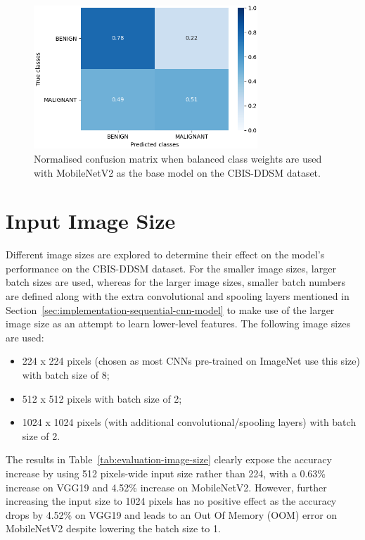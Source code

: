 \begin{figure}[h]
\centerline{\includegraphics[width=0.75\textwidth]{figures/evaluation/class_weights_experiment/balanced.png}}
\caption{\label{fig:evaluation-class_weights_experiment-balanced}Normalised confusion matrix when balanced class weights are used with MobileNetV2 as the base model on the CBIS-DDSM dataset.}
\end{figure}


\section{Input Image Size}
\label{sec:evaluation-input-image-size}

Different image sizes are explored to determine their effect on the model's performance on the CBIS-DDSM dataset. For the smaller image sizes, larger batch sizes are used, whereas for the larger image sizes, smaller batch numbers are defined along with the extra convolutional and spooling layers mentioned in Section~\ref{sec:implementation-sequential-cnn-model} to make use of the larger image size as an attempt to learn lower-level features. The following image sizes are used:
\begin{itemize}
    \item 224 x 224 pixels (chosen as most CNNs pre-trained on ImageNet use this size) with batch size of 8;
    \item 512 x 512 pixels with batch size of 2;
    \item 1024 x 1024 pixels (with additional convolutional/spooling layers) with batch size of 2.
\end{itemize}



The results in Table~\ref{tab:evaluation-image-size} clearly expose the accuracy increase by using 512 pixels-wide input size rather than 224, with a 0.63\% increase on VGG19 and 4.52\% increase on MobileNetV2. However, further increasing the input size to 1024 pixels has no positive effect as the accuracy drops by 4.52\% on VGG19 and leads to an Out Of Memory (OOM) error on MobileNetV2 despite lowering the batch size to 1.\\

